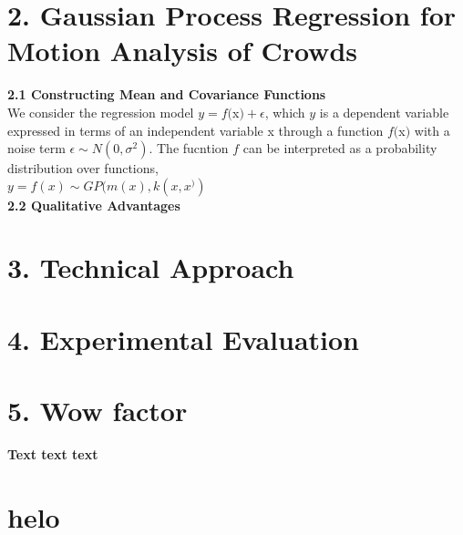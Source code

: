 \documentclass[letterpaper]{article}
\begin{document}
\section{2.  Gaussian Process Regression for Motion Analysis of Crowds}

{\bf2.1  Constructing Mean and Covariance Functions} \\

We consider the regression model $y = f($x$) + \epsilon$, which $y$ is a dependent variable expressed in terms of an independent variable x through a function $f($x$)$ with a noise term $\epsilon \sim N(0, \sigma^2)$. The fucntion $f$ can be interpreted as a probability distribution over functions, \\

$ y = f(x) \sim GP(m(x), k(x,x^))$ \\

{\bf2.2  Qualitative Advantages} \\

\section{3.  Technical Approach}

\section{4.  Experimental Evaluation}

\section{5.  Wow factor}


\textbf{Text text text}
\section{helo}
\end{document}
